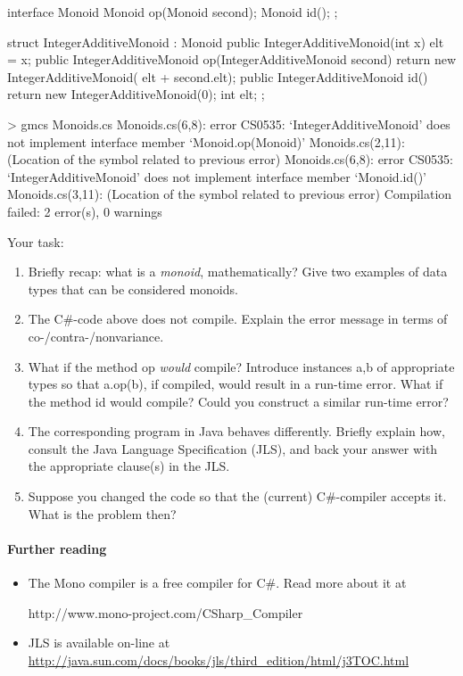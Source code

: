 \documentclass{article}
\begin{document}
\begin{java}
interface Monoid {
   Monoid op(Monoid second);
   Monoid id();
};

struct IntegerAdditiveMonoid : Monoid {
    public IntegerAdditiveMonoid(int x) { 
         elt = x;
    }    
    public IntegerAdditiveMonoid op(IntegerAdditiveMonoid second) { 
         return new IntegerAdditiveMonoid(
             elt + second.elt); 
    }
    public IntegerAdditiveMonoid id(){ 
         return new IntegerAdditiveMonoid(0);
    }
    int elt;
};

> gmcs Monoids.cs 
Monoids.cs(6,8): error CS0535: `IntegerAdditiveMonoid' does not implement 
  interface member `Monoid.op(Monoid)'
Monoids.cs(2,11): (Location of the symbol related to previous error)
Monoids.cs(6,8): error CS0535: `IntegerAdditiveMonoid' does not implement 
  interface member `Monoid.id()'
Monoids.cs(3,11): (Location of the symbol related to previous error)
Compilation failed: 2 error(s), 0 warnings

\end{java}
%
Your task:
\begin{enumerate}
\item Briefly recap: what is a \textit{monoid}, mathematically? Give two examples
of data types that can be considered monoids.
\item The C\#-code above does not compile. Explain the error message
in terms of co-/contra-/nonvariance.
\item What if the method \textsf{op} \textit{would} compile? 
Introduce instances \textsf{a,b} of appropriate types so that
\textsf{a.op(b)}, if compiled, would result in a run-time error.
What if the method 
\textsf{id} would compile? Could you construct a similar run-time
error? 
\item The corresponding program in Java behaves differently. Briefly
explain how, consult the Java Language Specification (JLS), and back your answer
with the appropriate clause(s) in the JLS.
\item Suppose you changed the code so that 
the (current) C\#-compiler accepts it. What is the problem then? 
\end{enumerate}

\paragraph{Further reading}
\begin{itemize}

\item The Mono compiler is a free compiler for C\#. Read more about it
at

\textsf{http://www.mono-project.com/CSharp\_Compiler}

\item JLS is available on-line 
 at 
\url{http://java.sun.com/docs/books/jls/third_edition/html/j3TOC.html}

\end{itemize}
\end{document}
